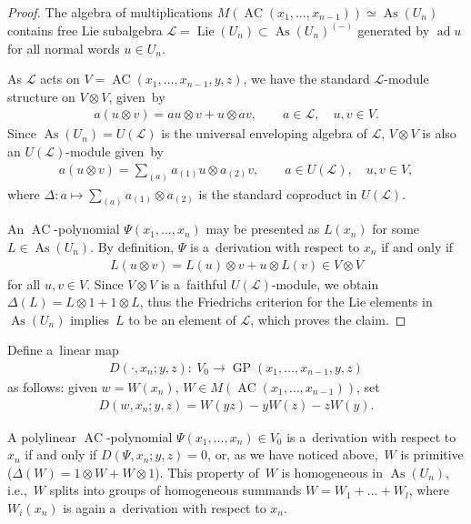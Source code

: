 \documentclass[pdftex]{sigma}
\DeclareMathOperator{\ad}{ad}
\begin{document}
\begin{proof}
The algebra of multiplications $M(\operatorname{AC}(x_1,\dots, x_{n-1}))\simeq \operatorname{As}(U_n)$ contains free Lie subalgebra $\mathcal L =
\operatorname{Lie}(U_n)\subset \operatorname{As}(U_n)^{(-)}$ generated by $\ad u$ for all normal words $u\in U_n$.

As $\mathcal L$ acts on $V=\operatorname{AC}(x_1,\dots, x_{n-1}, y,z)$, we have the standard $\mathcal L$-module structure on $V\otimes
V$, given~by
\begin{gather*}
a(u\otimes v) = au\otimes v + u\otimes av,
\qquad
a\in \mathcal L,
\quad
u,v\in V.
\end{gather*}
Since $\operatorname{As}(U_n)=U(\mathcal L)$ is the universal enveloping algebra of $\mathcal L$, $V\otimes V $ is also an $U(\mathcal
L)$-module given~by
\begin{gather*}
a(u\otimes v) = \sum\limits_{(a)} a_{(1)}u\otimes a_{(2)}v,
\qquad
a\in U(\mathcal L),
\quad
u,v\in V,
\end{gather*}
where $\Delta:a\mapsto \sum\limits_{(a)} a_{(1)}\otimes a_{(2)}$ is the standard coproduct in $U(\mathcal L)$.

An $\operatorname{AC}$-polynomial $\Psi (x_1,\dots, x_n)$ may be presented as $L(x_n)$ for some $L\in \operatorname{As}(U_n)$.
By def\/inition, $\Psi $ is a~derivation with respect to $x_n$ if and only if
\begin{gather*}
L(u\otimes v) = L(u)\otimes v + u\otimes L(v) \in V\otimes V
\end{gather*}
for all $u,v\in V$.
Since $V\otimes V$ is a~faithful $U(\mathcal L)$-module, we obtain $\Delta (L) = L\otimes 1 + 1\otimes L$, thus the
Friedrichs criterion for the Lie elements in $\operatorname{As}(U_n)$ implies~$L$ to be an element of $\mathcal L$, which proves the
claim.
\end{proof}

Def\/ine a~linear map
\begin{gather*}
D(\cdot, x_n; y,z): \ V_0 \to \operatorname{GP}(x_1,\dots, x_{n-1}, y,z)
\end{gather*}
as follows: given $w=W(x_n)$, $W\in M(\operatorname{AC}(x_1,\dots, x_{n-1}))$, set
\begin{gather*}
D(w, x_n; y,z) = W(yz) - yW(z) - zW(y).
\end{gather*}

A polylinear $\operatorname{AC}$-polynomial $\Psi (x_1,\dots, x_n)\in V_0$ is a~derivation with respect to $x_n$ if and only if $D(\Psi,
x_n; y,z)=0$, or, as we have noticed above,~$W$ is primitive ($\Delta (W) = 1\otimes W + W\otimes 1$).
This property of~$W$ is homogeneous in $\operatorname{As}(U_n)$, i.e.,~$W$ splits into groups of homogeneous summands $W=W_1+\dots+W_l$,
where $W_i(x_n)$ is again a~derivation with respect to $x_n$.
\end{document}

